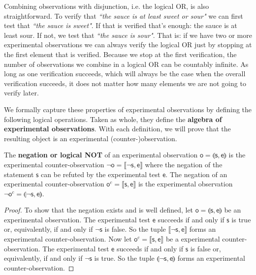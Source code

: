 \documentclass[11pt,letterpaper,fleqn]{memoir} %
\begin{document}
Combining observations with disjunction, i.e. the logical OR, is also straightforward. To verify that \emph{``the sauce is at least sweet or sour"} we can first test that \emph{``the sauce is sweet"}. If that is verified that's enough: the sauce is at least sour. If not, we test that \emph{``the sauce is sour"}. That is: if we have two or more experimental observations we can always verify the logical OR just by stopping at the first element that is verified. Because we stop at the first verification, the number of observations we combine in a logical OR can be countably infinite. As long as one verification succeeds, which will always be the case when the overall verification succeeds, it does not matter how many elements we are not going to verify later.

\begin{mathSection}

We formally capture these properties of experimental observations by defining the following logical operations. Taken as whole, they define the \textbf{algebra of experimental observations}. With each definition, we will prove that the resulting object is an experimental (counter-)observation. 

\begin{defn}
	The \textbf{negation or logical NOT} of an experimental observation $\mathsf{o}=\llparenthesis \mathsf{s}, \mathsf{e}\rrparenthesis$ is the experimental counter-observation $\neg \mathsf{o}=\llbracket\neg \mathsf{s}, \mathsf{e}\rrbracket$ where the negation of the statement $\mathsf{s}$ can be refuted by the experimental test $\mathsf{e}$. The negation of an experimental counter-observation $\mathsf{o}^c=\llbracket\mathsf{s}, \mathsf{e}\rrbracket$ is the experimental observation $\neg \mathsf{o}^c=\llparenthesis \neg \mathsf{s}, \mathsf{e}\rrparenthesis$.
\end{defn}

\begin{proof}
	To show that the negation exists and is well defined, let $\mathsf{o}=\llparenthesis \mathsf{s}, \mathsf{e}\rrparenthesis$ be an experimental observation. The experimental test $\mathsf{e}$ succeeds if and only if $\mathsf{s}$ is true or, equivalently, if and only if $\neg \mathsf{s}$ is false. So the tuple $\llbracket\neg \mathsf{s}, \mathsf{e}\rrbracket$ forms an experimental counter-observation. Now let $\mathsf{o}^c=\llbracket\mathsf{s}, \mathsf{e}\rrbracket$ be a experimental counter-observation. The experimental test $\mathsf{e}$ succeeds if and only if $\mathsf{s}$ is false or, equivalently, if and only if $\neg \mathsf{s}$ is true. So the tuple $\llparenthesis \neg \mathsf{s}, \mathsf{e}\rrparenthesis$ forms an experimental counter-observation.
\end{proof}


\end{mathSection}
\end{document}
